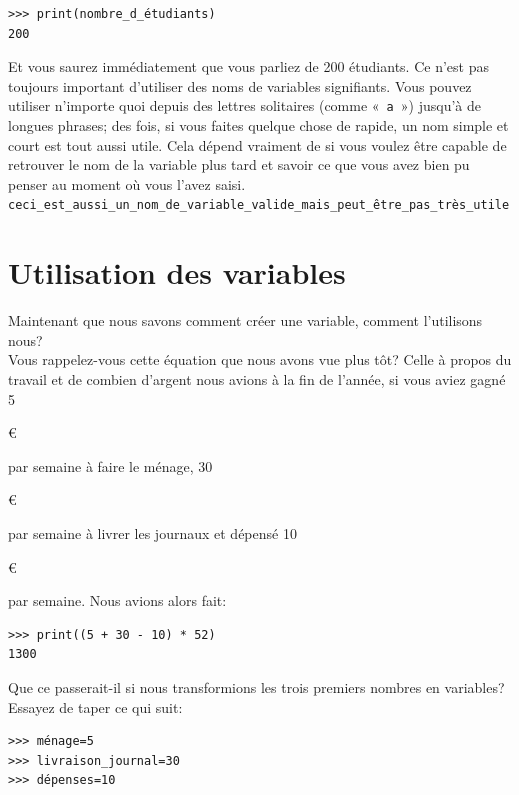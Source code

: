 \begin{Verbatim}[frame=single,rulecolor=\color{mbleu}, label=à taper]
>>> print(nombre_d_étudiants)
200
\end{Verbatim}

Et vous saurez immédiatement que vous parliez de 200 étudiants. Ce n'est pas toujours important d'utiliser des noms de variables signifiants. Vous pouvez utiliser n'importe quoi depuis des lettres solitaires (comme «~\texttt{a}~») jusqu'à de longues phrases; des fois, si vous faites quelque chose de rapide, un nom simple et court est tout aussi utile. Cela dépend vraiment de si vous voulez être capable de retrouver le nom de la variable plus tard et savoir ce que vous avez bien pu penser au moment où vous l'avez saisi.\\

\texttt{ceci\_est\_aussi\_un\_nom\_de\_variable\_valide\_mais\_peut\_être\_pas\_très\_utile}\\

\section{Utilisation des variables}

Maintenant que nous savons comment créer une variable, comment l'utilisons nous?\\ Vous rappelez-vous cette équation que nous avons vue plus tôt? Celle à propos du travail et de combien d'argent nous avions à la fin de l'année, si vous aviez gagné 5\begin{small}\euro\end{small} par semaine à faire le ménage, 30\begin{small}\euro\end{small} par semaine à livrer les journaux et dépensé 10\begin{small}\euro\end{small} par semaine. Nous avions alors fait:

\begin{Verbatim}[frame=single,rulecolor=\color{mbleu}, label=à taper]
>>> print((5 + 30 - 10) * 52)
1300
\end{Verbatim}

Que ce passerait-il si nous transformions les trois premiers nombres en variables? Essayez de taper ce qui suit:

\begin{Verbatim}[frame=single,rulecolor=\color{mbleu}, label=à taper]
>>> ménage=5
>>> livraison_journal=30
>>> dépenses=10
\end{Verbatim}
 


